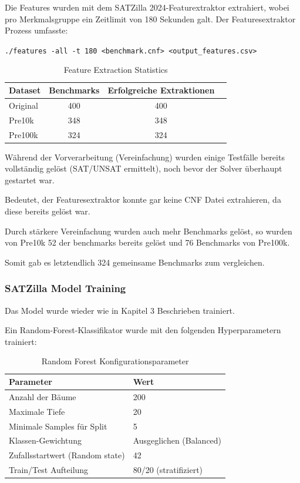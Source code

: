 Die Features  wurden mit dem SATZilla 2024-Featurextraktor extrahiert, wobei pro Merkmalsgruppe ein 
Zeitlimit von 180 Sekunden galt. Der Featuresextraktor Prozess umfasste:

\verb|./features -all -t 180 <benchmark.cnf> <output_features.csv>|

\newpage

\begin{table}[H]
    \centering
    \begin{tabular}{lccc}
        \textbf{Dataset} & \textbf{Benchmarks} & \textbf{Erfolgreiche Extraktionen} \\
        \toprule
        Original & 400 & 400 \\
        \midrule
        Pre10k & 348 & 348 \\
        \midrule
        Pre100k & 324 & 324  \\
        \bottomrule
    \end{tabular}
    \caption{Feature Extraction Statistics}\label{tab:extraction_stats}
\end{table}

Während der Vorverarbeitung (Vereinfachung) wurden einige Testfälle bereits vollständig gelöst 
(SAT/UNSAT ermittelt), noch bevor der Solver überhaupt gestartet war.

Bedeutet, der Featuresextraktor konnte gar keine CNF Datei extrahieren, da diese bereits gelöst war.

Durch stärkere Vereinfachung wurden auch mehr Benchmarks gelöst, so wurden von Pre10k 52 der benchmarks 
bereits gelöst und 76 Benchmarks von Pre100k.

Somit gab es letztendlich 324 gemeinsame Benchmarks zum vergleichen.



\subsubsection{SATZilla Model Training}

Das Model wurde wieder wie in Kapitel 3 Beschrieben trainiert.

Ein Random-Forest-Klassifikator wurde mit den folgenden Hyperparametern trainiert:

\begin{table}[H]
    \centering
    \begin{tabular}{ll}
        \textbf{Parameter} & \textbf{Wert} \\
        \toprule
        Anzahl der Bäume & 200 \\
        \midrule
        Maximale Tiefe & 20 \\
        \midrule
        Minimale Samples für Split & 5 \\
        \midrule
        Klassen-Gewichtung & Ausgeglichen (Balanced) \\
        \midrule
        Zufallsstartwert (Random state) & 42 \\
        \midrule
        Train/Test Aufteilung & 80/20 (stratifiziert) \\
        \bottomrule
    \end{tabular}
    \caption{Random Forest Konfigurationsparameter}\label{tab:rf_params}
\end{table}

